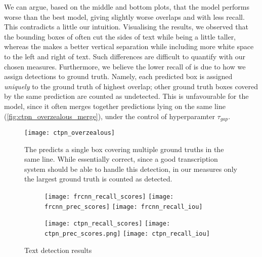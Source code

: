 		We can argue, based on the middle and bottom plots, that the model performs worse than the best \FRCNN{} model, giving slightly worse overlaps and with less recall. This contradicts a little our intuition. Visualising the results, we observed that the bounding boxes of \FRCNN{} often cut the sides of text while being a little taller, whereas the \CTPN{} makes a better vertical separation while including more white space to the left and right of text. Such differences are difficult to quantify with our chosen measures. Furthermore, we believe the lower recall of \CTPN{} is due to how we assign detections to ground truth. Namely, each predicted box is assigned \emph{uniquely} to the ground truth of highest overlap; other ground truth boxes covered by the same prediction are counted as undetected. This is unfavourable for the model, since it often merges together predictions lying on the same line (\autoref{fig:ctpn_overzealous_merge}), under the control of hyperparamter \(\tau_{gap}\).
		\begin{figure}
			\texttt{[image: ctpn\_overzealous]}
			\caption[\CTPN{} overzealous merging]{The \CTPN{} predicts a single box covering multiple ground truths in the same line. While essentially correct, since a good transcription system should be able to handle this detection, in our measures only the largest ground truth is counted as detected.}
			\label{fig:ctpn_overzealous_merge}
		\end{figure}

		\begin{figure}
			\vspace{-2em}
			\begin{subfigure}{.49\linewidth}
					\caption{\FRCNN{}}\label{fig:frcnn_results}
					\texttt{[image: frcnn\_recall\_scores]}
					\texttt{[image: frcnn\_prec\_scores]}
					\texttt{[image: frcnn\_recall\_iou]}
			\end{subfigure}
			\begin{subfigure}{.49\linewidth}
					\caption{\CTPN{}}\label{fig:ctpn_results}
					\texttt{[image: ctpn\_recall\_scores]}
					\texttt{[image: ctpn\_prec\_scores.png]}
					\texttt{[image: ctpn\_recall\_iou]}
			\end{subfigure}
			\caption{Text detection results}
		\end{figure}
